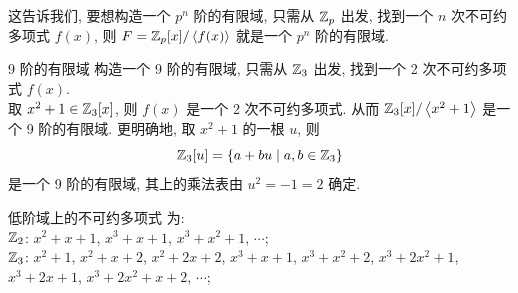         \begin{rmk}
            这告诉我们, 要想构造一个 \(p^n\) 阶的有限域, 只需从 \(\operatorname{\mathbb{Z}}_p\) 出发, 找到一个 \(n\) 次不可约多项式 \(f(x)\), 则 \(F=\operatorname{\mathbb{Z}}_p[x]/\expval{f(x)}\) 就是一个 \(p^n\) 阶的有限域.
        \end{rmk}

        \begin{ins}
            {9 阶的有限域}
            构造一个 9 阶的有限域, 只需从 \(\operatorname{\mathbb{Z}}_3\) 出发, 找到一个 2 次不可约多项式 \(f(x)\). \\
            取 \(x^2+1\in\operatorname{\mathbb{Z}}_3[x]\), 则 \(f(x)\) 是一个 2 次不可约多项式. 从而 \(\operatorname{\mathbb{Z}}_3[x]/\expval{x^2+1}\) 是一个 9 阶的有限域. 
            更明确地, 取 \(x^2+1\) 的一根 \(u\), 则
            \[\operatorname{\mathbb{Z}}_3[u]=\{a+bu \mid a,b\in\operatorname{\mathbb{Z}}_3\}\]
            是一个 9 阶的有限域, 其上的乘法表由 \(u^2=-1=2\) 确定.
        \end{ins}

        \begin{ins}
            {低阶域上的不可约多项式}
            为:\\
            \(\operatorname{\mathbb{Z}}_2\): \(x^2+x+1\), \(x^3+x+1\), \(x^3+x^2+1\), \(\cdots\);\\
            \(\operatorname{\mathbb{Z}}_3\): \(x^2+1\), \(x^2+x+2\), \(x^2+2x+2\), \(x^3+x+1\), \(x^3+x^2+2\), \(x^3+2x^2+1\), \(x^3+2x+1\), \(x^3+2x^2+x+2\), \(\cdots\);
        \end{ins}